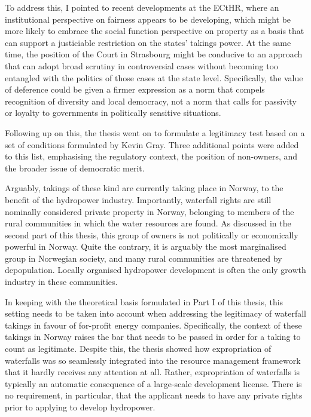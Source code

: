 {To address this, I pointed to recent developments at the ECtHR, where an institutional perspective on fairness appears to be developing, which might be more likely to embrace the social function perspective on property as a basis that can support a justiciable restriction on the states' takings power. At the same time, the position of the Court in Strasbourg might be conducive to an approach that can adopt broad scrutiny in controversial cases without becoming too entangled with the politics of those cases at the state level. Specifically, the value of deference could be given a firmer expression as a norm that compels recognition of diversity and local democracy, not a norm that calls for passivity or loyalty to governments in politically sensitive situations.

Following up on this, the thesis went on to formulate a legitimacy test based on a set of conditions formulated by Kevin Gray. Three additional points were added to this list, emphasising the regulatory context, the position of non-owners, and the broader issue of democratic merit. 
}

Arguably, takings of these kind are currently taking place in Norway, to the benefit of the hydropower industry. Importantly, waterfall rights are still nominally considered private property in Norway, belonging to members of the rural communities in which the water resources are found. As discussed in the second part of this thesis, this group of owners is not politically or economically powerful in Norway. Quite the contrary, it is arguably the most marginalised group in Norwegian society, and many rural communities are threatened by depopulation. Locally organised hydropower development is often the only growth industry in these communities.

In keeping with the theoretical basis formulated in Part I of this thesis, this setting needs to be taken into account when addressing the legitimacy of waterfall takings in favour of for-profit energy companies. Specifically, the context of these takings in Norway raises the bar that needs to be passed in order for a taking to count as legitimate. Despite this, the thesis showed how expropriation of waterfalls was so seamlessly integrated into the resource management framework that it hardly receives any attention at all. Rather, expropriation of waterfalls is typically an automatic consequence of a large-scale development license. There is no requirement, in particular, that the applicant needs to have any private rights prior to applying to develop hydropower.


